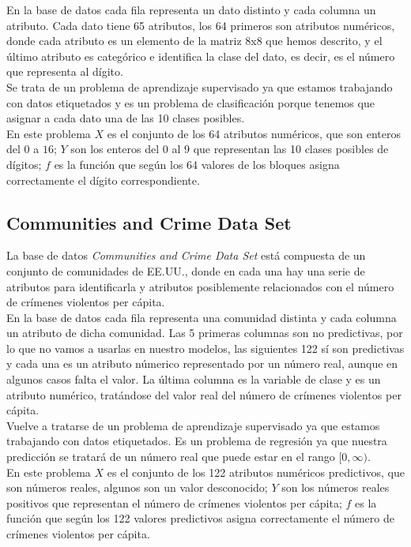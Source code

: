 \documentclass[12pt]{article}
\begin{document}
En la base de datos cada fila representa un dato distinto y cada columna un atributo.
Cada dato tiene 65 atributos, los 64 primeros son atributos numéricos, donde cada atributo es un elemento de la matriz 8x8 que hemos descrito, y el último atributo es categórico e identifica la clase del dato, es decir, es el número que representa al dígito.\\

Se trata de un problema de aprendizaje supervisado ya que estamos trabajando con datos etiquetados y es un problema de clasificación porque tenemos que asignar a cada dato una de las 10 clases posibles.\\

En este problema $X$ es el conjunto de los 64 atributos numéricos, que son enteros del $0$ a $16$; $Y$ son los enteros del $0$ al $9$ que representan las 10 clases posibles de dígitos; $f$ es la función que según los 64 valores de los bloques asigna correctamente el dígito correspondiente.

\subsection{Communities and Crime Data Set}

La base de datos \textit{Communities and Crime Data Set} está compuesta de un conjunto de comunidades de EE.UU., donde en cada una hay una serie de atributos para identificarla y atributos posiblemente relacionados con el número de crímenes violentos per cápita.\\

En la base de datos cada fila representa una comunidad distinta y cada columna un atributo de dicha comunidad.
Las 5 primeras columnas son no predictivas, por lo que no vamos a usarlas en nuestro modelos, las siguientes 122 sí son predictivas y cada una es un atributo númerico representado por un número real, aunque en algunos casos falta el valor. La última columna es la variable de clase y es un atributo numérico, tratándose del valor real del número de crímenes violentos per cápita.\\

Vuelve a tratarse de un problema de aprendizaje supervisado ya que estamos trabajando con datos etiquetados. Es un problema de regresión ya que nuestra predicción se tratará de un número real que puede estar en el rango $[0, \infty)$.\\

En este problema $X$ es el conjunto de los 122 atributos numéricos predictivos, que son números reales, algunos son un valor desconocido; $Y$ son los números reales positivos que representan el número de crímenes violentos per cápita; $f$ es la función que según los 122  valores predictivos asigna correctamente el número de crímenes violentos per cápita.
\end{document}
